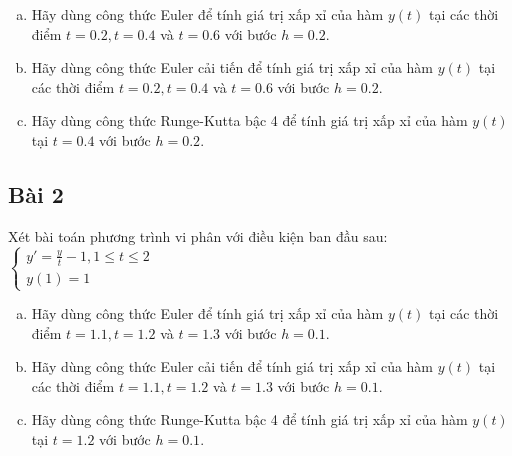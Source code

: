 \documentclass[12pt]{article}
\begin{document}
\begin{enumerate}[a).]
\item Hãy dùng công thức Euler để tính giá trị xấp xỉ của hàm $y(t)$ tại các thời điểm $t=0.2, t=0.4$ và $t=0.6$ với bước $h=0.2$.
\item Hãy dùng công thức Euler cải tiến để tính giá trị xấp xỉ của hàm $y(t)$ tại các thời điểm $t=0.2, t=0.4$ và $t=0.6$ với bước $h=0.2$.
\item Hãy dùng công thức Runge-Kutta bậc 4 để tính giá trị xấp xỉ của hàm $y(t)$ tại $t=0.4$ với bước $h=0.2$.
\end{enumerate}

\subsection{Bài 2}

Xét bài toán phương trình vi phân với điều kiện ban đầu sau:
$
 \left\lbrace \begin{array}{l}
               y' = \frac{y}{t}-1, 1 \leq t \leq 2 \\
               y(1)=1
              \end{array}
\right.
$

\begin{enumerate}[a).]
\item Hãy dùng công thức Euler để tính giá trị xấp xỉ của hàm $y(t)$ tại các thời điểm $t=1.1, t=1.2$ và $t=1.3$ với bước $h=0.1$.
\item Hãy dùng công thức Euler cải tiến để tính giá trị xấp xỉ của hàm $y(t)$ tại các thời điểm $t=1.1, t=1.2$ và $t=1.3$ với bước $h=0.1$.
\item Hãy dùng công thức Runge-Kutta bậc 4 để tính giá trị xấp xỉ của hàm $y(t)$ tại $t=1.2$ với bước $h=0.1$.
\end{enumerate}
\end{document}
